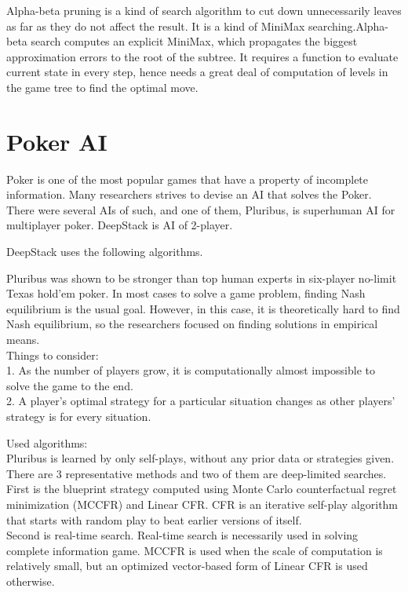 \documentclass[11pt]{article}
\begin{document}
	Alpha-beta pruning is a kind of search algorithm to cut down unnecessarily leaves as far as they do not affect the result. It is a kind of MiniMax searching.Alpha-beta search computes an explicit MiniMax, which propagates the biggest approximation errors to the root of the subtree. It requires a function to evaluate current state in every step, hence needs a great deal of computation of levels in the game tree to find the optimal move.
	
	
	
	
	\section{Poker AI}\label{section-poker}
	
	Poker is one of the most popular games that have a property of incomplete information. Many researchers strives to devise an AI that solves the Poker. There were several AIs of such, and one of them, Pluribus, is superhuman AI for multiplayer poker. DeepStack is AI of 2-player.
	
	
	DeepStack uses the following algorithms.
		
	Pluribus was shown to be stronger than top human experts in six-player no-limit Texas hold'em poker. In most cases to solve a game problem, finding Nash equilibrium is the usual goal. However, in this case, it is theoretically hard to find Nash equilibrium, so the researchers focused on finding solutions in empirical means.\\
	
	Things to consider: \\
	1. As the number of players grow, it is computationally almost impossible to solve the game to the end.\\
	2. A player's optimal strategy for a particular situation changes as other players' strategy is for every situation. 

	Used algorithms:\\
	Pluribus is learned by only self-plays, without any prior data or strategies given. There are $3$ representative methods and two of them are deep-limited searches.\\	%
	First is the blueprint strategy computed using Monte Carlo counterfactual regret minimization (MCCFR) and Linear CFR. CFR is an iterative self-play algorithm that starts with random play to beat earlier versions of itself.\\ %
	Second is real-time search. Real-time search is necessarily used in solving complete information game. MCCFR is used when the scale of computation is relatively small, but an optimized vector-based form of Linear CFR is used otherwise.\\
	
\end{document}
